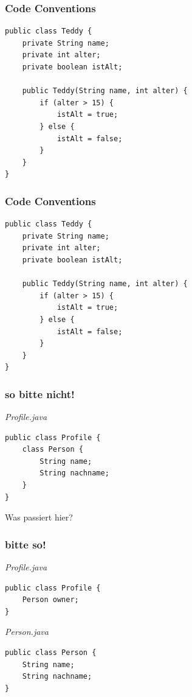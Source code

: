 \documentclass[18pt]{beamer}
\begin{document}
\begin{frame}[containsverbatim]
	\frametitle{Code Conventions}
		\begin{lstlisting}
public class Teddy {
	private String name;
	private int alter;
	private boolean istAlt;
	
	public Teddy(String name, int alter) {
		if (alter > 15) {
			istAlt = true;
		} else {
			istAlt = false;
		}
	}
}
		\end{lstlisting}

\end{frame}


\begin{frame}[containsverbatim]
	\frametitle{Code Conventions}
		\begin{lstlisting}[showtabs=true, showspaces=true]
public class Teddy {
	private String name;
	private int alter;
	private boolean istAlt;

	public Teddy(String name, int alter) {
		if (alter > 15) {
			istAlt = true;
		} else {
			istAlt = false;
		}
	}
}
		\end{lstlisting}

\end{frame}


\begin{frame}[containsverbatim]
	\frametitle{so bitte nicht!}
	
		\emph{Profile.java}
		\begin{lstlisting}
public class Profile {
	class Person {
		String name;
		String nachname;
	}
}
		\end{lstlisting}
		
		Was passiert hier?
\end{frame}

\begin{frame}[containsverbatim]
	\frametitle{bitte so!}
	
		\emph{Profile.java}
		\begin{lstlisting}
public class Profile {
	Person owner;
}
		\end{lstlisting}
		
		
		\emph{Person.java}
		\begin{lstlisting}
public class Person {
	String name;
	String nachname;
}
		\end{lstlisting}
\end{frame}
\end{document}
